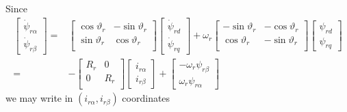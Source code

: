 \documentclass[11pt,a4paper,oneside]{book}
\numberwithin{equation}{section}
\theoremstyle{it}
\theoremstyle{definition}
\begin{document}
Since
\begin{equation} \label{eq36}
	\begin{split}
		\left[
		\begin{matrix}
			\dot{\psi}_{r\alpha} \\[6pt]
			\dot{\psi}_{r\beta}
		\end{matrix} \right] = &
		\left[
		\begin{matrix}
			\cos\vartheta_r & -\sin\vartheta_r \\[6pt]
			\sin\vartheta_r & \cos\vartheta_r \\[6pt]
		\end{matrix} \right]
		\left[
		\begin{matrix}
			\dot{\psi}_{rd} \\[6pt]
			\dot{\psi}_{rq}
		\end{matrix} \right] + \omega_r
		\left[
		\begin{matrix}
			-\sin\vartheta_r & -\cos\vartheta_r \\[6pt]
			\cos\vartheta_r & -\sin\vartheta_r \\[6pt]
		\end{matrix} \right]
		\left[
		\begin{matrix}
			\psi_{rd} \\[6pt]
			\psi_{rq}
		\end{matrix} \right] \\[6pt]
		= & -
		\left[
		\begin{matrix}
			R_r & 0 \\[6pt]
			0 & R_r \\[6pt]
		\end{matrix} \right]
		\left[
		\begin{matrix}
			i_{r\alpha} \\[6pt]
			i_{r\beta}
		\end{matrix} \right] + 
		\left[
		\begin{matrix}
			-\omega_r{\psi}_{r\beta} \\[6pt]
			\omega_r{\psi}_{r\alpha}
		\end{matrix} \right]
	\end{split}
\end{equation}
we may write in $(i_{r\alpha}, i_{r\beta})$ coordinates
\end{document}
